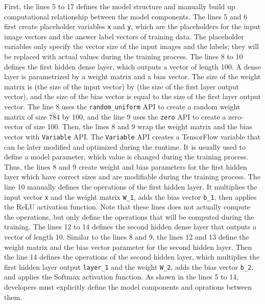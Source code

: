First, the lines 5 to 17 defines the model structure and manually build up
computational relationship between the model components.
The lines 5 and 6 first create placeholder variables {\tt x} and {\tt y},
which are the placeholders for the input image vectors 
and the answer label vectors of training data.
The placeholder variables only specify the vector size of the input images
and the labels; they will be replaced with actual values during the training
process. 
The lines 8 to 10 defines the first hidden dense layer, which outputs a
vector of length 100.
A dense layer is parametrized by a weight matrix and a bias vector.
The size of the weight matrix is (the size of the input vector) by 
(the size of the first layer output vector), and the size of the bias vector
is equal to the size of the first layer output vector.
The line 8 uses the {\tt random\_uniform} API to create 
a random weight matrix of size 784 by 100, 
and the line 9 uses the {\tt zero} API to create a zero-vector of size 100.
Then, the lines 8 and 9 wrap the weight matrix and the bias vector with
{\tt Variable} API.
The {\tt Variable} API creates a TensorFlow variable that can be later modified
and optimized during the runtime.
It is usually used to define a model parameter, 
which value is changed during the training process.
Thus, the lines 8 and 9 create weight and bias parameters for the first
hidden layer which have correct sizes and are modifiable during the 
training process.
The line 10 manually defines the operations of the first hidden layer. 
It multiplies the input vector {\tt x} and the weight matrix 
{\tt W\_1}, adds the bias vector {\tt b\_1}, then applies the ReLU activation
function.
Note that these lines does not actually compute the operations,
but only define the operations that will be computed during the training.
The lines 12 to 14 defines the second hidden dense layer that outputs a
vector of length 10.
Similar to the lines 8 and 9, the lines 12 and 13 define the weight matrix
and the bias vector parameter for the second hidden layer.
Then the line 14 defines the operations of the second hidden layer,
which multiplies the first hidden layer output {\tt layer\_1} and
the weight {\tt W\_2}, adds the bias vector {\tt b\_2}, and applies the
Softmax activation function.
As shown in the lines 5 to 14, developers must explicitly define
the model components and oprations between them.

